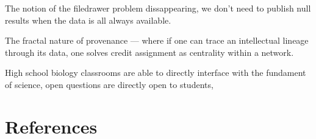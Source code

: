 \documentclass[nohyper]{tufte-book-jls}
\begin{document}
The notion of the filedrawer problem dissappearing, we don't need to
publish null results when the data is all always available.

The fractal nature of provenance --- where if one can trace an
intellectual lineage through its data, one solves credit assignment as
centrality within a network.

High school biology classrooms are able to directly interface with the
fundament of science, open questions are directly open to students,

\hypertarget{references}{%
\section{References}\label{references}}




\end{document}
